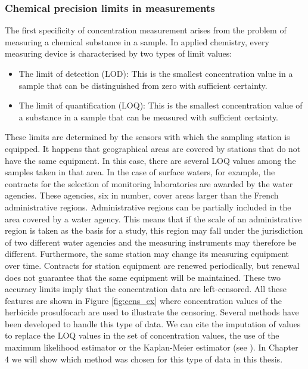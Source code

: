 \subsubsection{Chemical precision limits in measurements}

The first specificity of concentration measurement arises from the problem of measuring a chemical substance in a sample. In applied chemistry, every measuring device is characterised by two types of limit values: 
\begin{itemize}
    \item The limit of detection (LOD): This is the smallest concentration value in a sample that can be distinguished from zero with sufficient certainty.
    \item The limit of quantification (LOQ): This is the smallest concentration value of a substance in a sample that can be measured with  sufficient certainty. 
\end{itemize}
These limits are determined by the sensors with which the sampling station is equipped. It happens that geographical areas are covered by stations that do not have the same equipment. In this case, there are several LOQ values among the samples taken in that area. In the case of surface waters, for example, the contracts for the selection of monitoring laboratories are awarded by the water agencies. These agencies, six in number, cover areas larger than the French administrative regions. Administrative regions can be partially included in the area covered by a water agency. This means that if the scale of an administrative region is taken as the basis for a study, this region may fall under the jurisdiction of two different water agencies and the measuring instruments may therefore be different. Furthermore, the same station may change its measuring equipment over time. Contracts for station equipment are renewed periodically, but renewal does not guarantee that the same equipment will be maintained. These two accuracy limits imply that the concentration data are left-censored. All these features are shown in Figure \ref{fig:cens_ex} where concentration values of the herbicide prosulfocarb are used to illustrate the censoring. Several methods have been developed to handle this type of data. We can cite the imputation of values to replace the LOQ values in the set of concentration values, the use of the maximum likelihood estimator or the Kaplan-Meier estimator (see \cite{Gillaizeau2020,Croghan2003MethodsOD}). In Chapter 4 we will show which method was chosen for this type of data in this thesis. 

